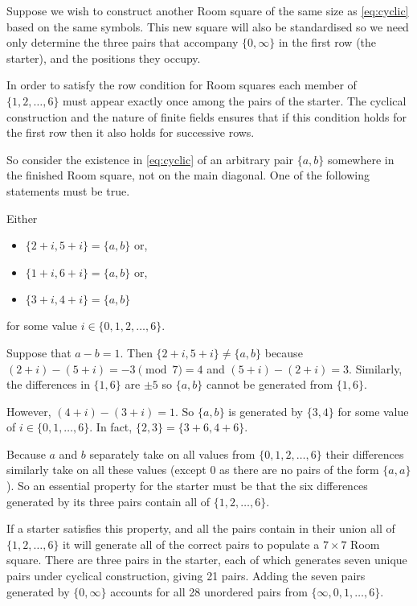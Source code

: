 Suppose we wish to construct another Room square of the same size as \eqref{eq:cyclic} based on the same symbols.
This new square will also be standardised so we need only determine the three pairs that accompany $\{0, \infty\}$ in the first row (the starter), and the positions they occupy.

In order to satisfy the row condition for Room squares each member of $\{1, 2, \ldots, 6\}$ must appear exactly once among the pairs of the starter.
The cyclical construction and the nature of finite fields ensures that if this condition holds for the first row then it also holds for successive rows.

So consider the existence in \eqref{eq:cyclic} of an arbitrary pair $\{a, b\}$ somewhere in the finished Room square, not on the main diagonal.
One of the following statements must be true.

Either
\begin{itemize}
  \item $\{2 + i, 5 + i\} = \{a, b\}$ or,
  \item $\{1 + i, 6 + i\} = \{a, b\}$ or,
  \item $\{3 + i, 4 + i\} = \{a, b\}$
\end{itemize}
for some value $i \in \{0, 1, 2, \ldots, 6\}$.

Suppose that $a - b = 1$.
Then $\{2 + i, 5 + i\} \neq \{a, b\}$ because $(2 + i) - (5 + i) = -3\pmod 7 = 4$ and $(5 + i) - (2 + i) = 3$.
Similarly, the differences in $\{1, 6\}$ are $\pm 5$ so $\{a, b\}$ cannot be generated from $\{1, 6\}$.

However, $(4 + i) - (3 + i) = 1$.
So $\{a, b\}$ is generated by $\{3, 4\}$ for some value of $i \in \{0, 1, \ldots, 6\}$.
In fact, $\{2, 3\} = \{3 + 6, 4 + 6\}$.

Because $a$ and $b$ separately take on all values from $\{0, 1, 2, \ldots, 6\}$ their differences similarly take on all these values (except 0 as there are no pairs of the form $\{a, a\}$).
So an essential property for the starter must be that the six differences generated by its three pairs contain all of $\{1, 2, \ldots, 6\}$.

If a starter satisfies this property, and all the pairs contain in their union all of $\{1, 2, \ldots, 6\}$ it will generate all of the correct pairs to populate a $7 \times 7$ Room square. 
There are three pairs in the starter, each of which generates seven unique pairs under cyclical construction, giving 21 pairs.
Adding the seven pairs generated by $\{0, \infty\}$ accounts for all 28 unordered pairs from $\{\infty, 0, 1, \ldots, 6\}$.

